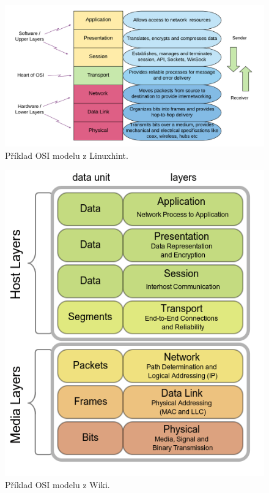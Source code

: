 \begin{figure}[H]
    \centering
    \includegraphics[width=1\linewidth]{osi_model_linuxhint.png}
    \caption{Příklad OSI modelu z Linuxhint.}
\end{figure}

\begin{figure}[H]
    \centering
    \includegraphics[width=0.65\linewidth]{osi_model_wiki.png}
    \caption{Příklad OSI modelu z Wiki.}
\end{figure}

